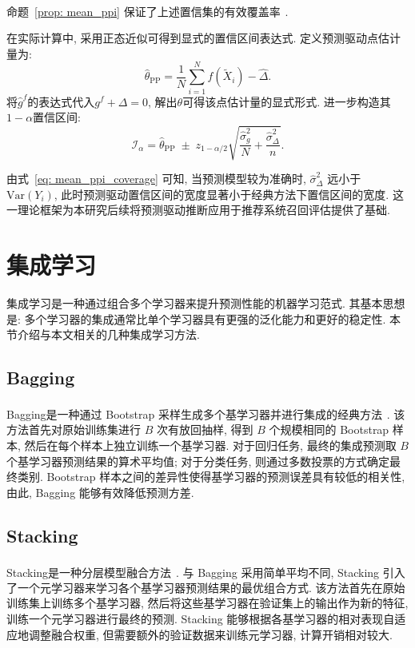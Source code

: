 \documentclass[a4paper, AutoFakeBold, UTF8]{ctexrep}
\theoremstyle{plain}
\newcommand{\upcite}[1]
{\textsuperscript{~\cite{#1}}}
\numberwithin{equation}{chapter}
\begin{document}
命题~\ref{prop: mean_ppi} 保证了上述置信集的有效覆盖率\upcite{Angelopoulos2023}. 

在实际计算中, 采用正态近似可得到显式的置信区间表达式. 定义预测驱动点估计量为: 
\begin{equation}
\hat{\theta}_{\mathrm{PP}} = \frac{1}{N}\sum_{i=1}^{N} f (\tilde{X}_i)  - \hat{\Delta}. \label{eq: theta_pp_def}
\end{equation}
将$\hat{g}^f$的表达式代入$g^f + \Delta = 0$, 解出$\theta$可得该点估计量的显式形式. 进一步构造其$1-\alpha$置信区间: 
\begin{equation}
\mathcal{I}_{\alpha} = \hat{\theta}_{\mathrm{PP}} \; \pm\;  z_{1-\alpha/2} \sqrt{ \frac{\hat{\sigma}_g^2}{N} + \frac{\hat{\sigma}_{\Delta}^2}{n} }. \label{eq: I_alpha}
\end{equation}

由式~\eqref{eq: mean_ppi_coverage} 可知, 当预测模型较为准确时, $\hat{\sigma}_{\Delta}^2$ 远小于 $\mathrm{Var} (Y_i) $, 此时预测驱动置信区间的宽度显著小于经典方法下置信区间的宽度. 这一理论框架为本研究后续将预测驱动推断应用于推荐系统召回评估提供了基础. 

\section{集成学习}

集成学习是一种通过组合多个学习器来提升预测性能的机器学习范式. 其基本思想是: 多个学习器的集成通常比单个学习器具有更强的泛化能力和更好的稳定性. 本节介绍与本文相关的几种集成学习方法. 

\subsection{Bagging}

Bagging是一种通过 Bootstrap 采样生成多个基学习器并进行集成的经典方法\upcite{Breiman1996}. 该方法首先对原始训练集进行 $B$ 次有放回抽样, 得到 $B$ 个规模相同的 Bootstrap 样本, 然后在每个样本上独立训练一个基学习器. 对于回归任务, 最终的集成预测取 $B$ 个基学习器预测结果的算术平均值; 对于分类任务, 则通过多数投票的方式确定最终类别. Bootstrap 样本之间的差异性使得基学习器的预测误差具有较低的相关性, 由此, Bagging 能够有效降低预测方差. 

\subsection{Stacking}

Stacking是一种分层模型融合方法\upcite{Wolpert1992}. 与 Bagging 采用简单平均不同, Stacking 引入了一个元学习器来学习各个基学习器预测结果的最优组合方式. 该方法首先在原始训练集上训练多个基学习器, 然后将这些基学习器在验证集上的输出作为新的特征, 训练一个元学习器进行最终的预测. Stacking 能够根据各基学习器的相对表现自适应地调整融合权重, 但需要额外的验证数据来训练元学习器, 计算开销相对较大. 
\end{document}
